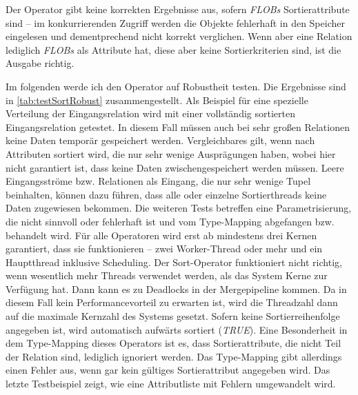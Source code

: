\documentclass[a4paper,12pt,twoside]{article}
\newcommand{\Fb}[1]{\textit{#1}} %
\begin{document}

Der Operator gibt keine korrekten Ergebnisse aus, sofern \Fb{FLOBs} Sortierattribute sind -- im konkurrierenden Zugriff werden die Objekte fehlerhaft in den Speicher eingelesen und dementprechend nicht korrekt verglichen. Wenn aber eine Relation lediglich \Fb{FLOBs} als Attribute hat, diese aber keine Sortierkriterien sind, ist die Ausgabe richtig.

Im folgenden werde ich den Operator auf Robustheit testen. Die Ergebnisse sind in \autoref{tab:testSortRobust} zusammengestellt. Als Beispiel für eine spezielle Verteilung der Eingangsrelation wird mit einer vollständig sortierten Eingangsrelation getestet. In diesem Fall müssen auch bei sehr großen Relationen keine Daten temporär gespeichert werden. Vergleichbares gilt, wenn nach Attributen sortiert wird, die nur sehr wenige Ausprägungen haben, wobei hier nicht garantiert ist, dass keine Daten zwischengespeichert werden müssen. Leere Eingangsströme bzw. Relationen als Eingang, die nur sehr wenige Tupel beinhalten, können dazu führen, dass alle oder einzelne Sortierthreads keine Daten zugewiesen bekommen. Die weiteren Tests betreffen eine Parametrisierung, die nicht sinnvoll oder fehlerhaft ist und vom Type-Mapping abgefangen bzw. behandelt wird. Für alle Operatoren wird erst ab mindestens drei Kernen garantiert, dass sie funktionieren --  zwei Worker-Thread oder mehr und ein Hauptthread inklusive Scheduling. Der Sort-Operator funktioniert nicht richtig, wenn wesentlich mehr Threads verwendet werden, als das System Kerne zur Verfügung hat. Dann kann es zu Deadlocks in der Mergepipeline kommen. Da in diesem Fall kein Performancevorteil zu erwarten ist, wird die Threadzahl dann auf die maximale Kernzahl des Systems gesetzt. Sofern keine Sortierreihenfolge angegeben ist, wird automatisch aufwärts sortiert (\Fb{TRUE}). Eine Besonderheit in dem Type-Mapping dieses Operators ist es, dass Sortierattribute, die nicht Teil der Relation sind, lediglich ignoriert werden. Das Type-Mapping gibt allerdings einen Fehler aus, wenn gar kein gültiges Sortierattribut angegeben wird. Das letzte Testbeispiel zeigt, wie eine Attributliste mit Fehlern umgewandelt wird.
\end{document}
